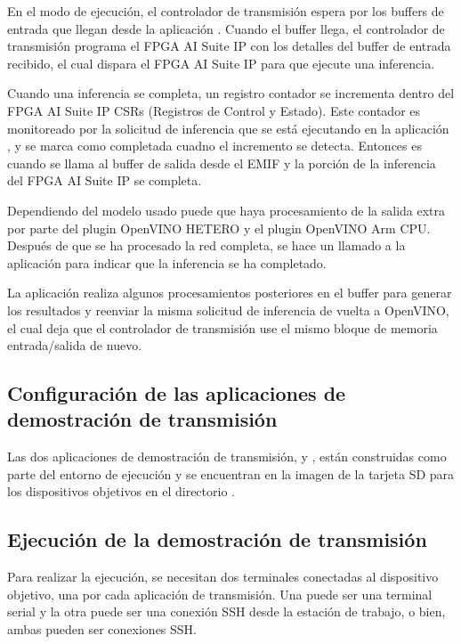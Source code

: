     En el modo de ejecuci\'on, el controlador de transmisi\'on espera por los buffers de entrada que llegan desde la aplicaci\'on . Cuando el buffer llega, el controlador de transmisi\'on programa el FPGA AI Suite IP con los detalles del buffer de entrada recibido, el cual dispara el FPGA AI Suite IP para que ejecute una inferencia.

    Cuando una inferencia se completa, un registro contador se incrementa dentro del FPGA AI Suite IP CSRs (Registros de Control y Estado). Este contador es monitoreado por la solicitud de inferencia que se est\'a ejecutando en la aplicaci\'on , y se marca como completada cuadno el incremento se detecta. Entonces es cuando se llama al buffer de salida desde el EMIF y la porci\'on de la inferencia del FPGA AI Suite IP se completa.

    Dependiendo del modelo usado puede que haya procesamiento de la salida extra por parte del plugin OpenVINO HETERO y el plugin OpenVINO Arm CPU. Despu\'es de que se ha procesado la red completa, se hace un llamado a la aplicaci\'on para indicar que la inferencia se ha completado.

    La aplicaci\'on realiza algunos procesamientos posteriores en el buffer para generar los resultados y reenviar la misma solicitud de inferencia de vuelta a OpenVINO, el cual deja que el controlador de transmisi\'on use el mismo bloque de memoria entrada/salida de nuevo.

\subsection{Configuraci\'on de las aplicaciones de demostraci\'on de transmisi\'on}

    Las dos aplicaciones de demostraci\'on de transmisi\'on,  y , est\'an construidas como parte del entorno de ejecuci\'on y se encuentran en la imagen de la tarjeta SD para los dispositivos objetivos en el directorio .

\subsection{Ejecuci\'on de la demostraci\'on de transmisi\'on}

    Para realizar la ejecuci\'on, se necesitan dos terminales conectadas al dispositivo objetivo, una por cada aplicaci\'on de transmisi\'on. Una puede ser una terminal serial y la otra puede ser una conexi\'on SSH desde la estaci\'on de trabajo, o bien, ambas pueden ser conexiones SSH.

